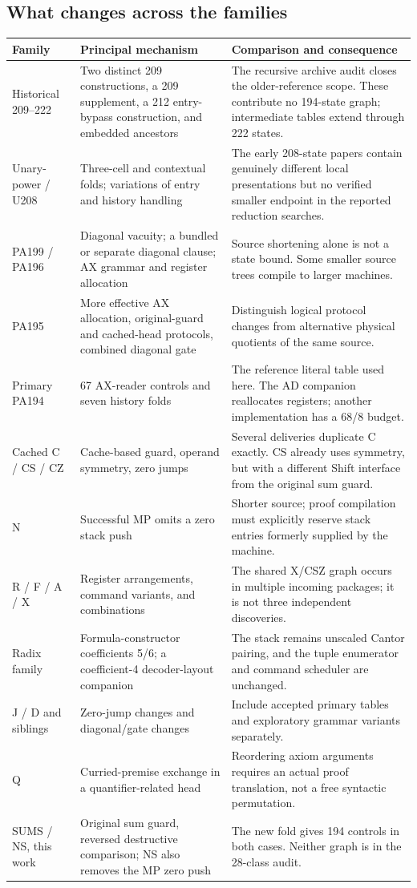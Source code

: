 \documentclass[11pt,a4paper]{article}
\begin{document}
\subsection{What changes across the families}
\begin{longtable}{p{.19\linewidth}p{.33\linewidth}p{.39\linewidth}}
\toprule
Family & Principal mechanism & Comparison and consequence\\
\midrule
Historical 209--222 & Two distinct 209 constructions, a 209 supplement,
a 212 entry-bypass construction, and embedded ancestors & The recursive
archive audit closes the older-reference scope. These contribute no
194-state graph; intermediate tables extend through 222 states.\\
Unary-power / U208 & Three-cell and contextual folds; variations of entry
and history handling & The early 208-state papers contain genuinely
different local presentations but no verified smaller endpoint in the
reported reduction searches.\\
PA199 / PA196 & Diagonal vacuity; a bundled or separate diagonal clause;
AX grammar and register allocation & Source shortening alone is not a
state bound. Some smaller source trees compile to larger machines.\\
PA195 & More effective AX allocation, original-guard and cached-head
protocols, combined diagonal gate & Distinguish logical protocol changes
from alternative physical quotients of the same source.\\
Primary PA194 & 67 AX-reader controls and seven history folds &
The reference literal table used here. The AD companion reallocates
registers; another implementation has a 68/8 budget.\\
Cached C / CS / CZ & Cache-based guard, operand symmetry, zero jumps &
Several deliveries duplicate C exactly. CS already uses symmetry, but
with a different Shift interface from the original sum guard.\\
N & Successful MP omits a zero stack push & Shorter source; proof compilation
must explicitly reserve stack entries formerly supplied by the machine.\\
R / F / A / X & Register arrangements, command variants, and combinations &
The shared X/CSZ graph occurs in multiple incoming packages; it is not
three independent discoveries.\\
Radix family & Formula-constructor coefficients 5/6; a coefficient-4
decoder-layout companion & The stack remains unscaled Cantor pairing,
and the tuple enumerator and command scheduler are unchanged.\\
J / D and siblings & Zero-jump changes and diagonal/gate changes &
Include accepted primary tables and exploratory grammar variants separately.\\
Q & Curried-premise exchange in a quantifier-related head & Reordering
axiom arguments requires an actual proof translation, not a free syntactic
permutation.\\
SUMS / NS, this work & Original sum guard, reversed destructive comparison;
NS also removes the MP zero push & The new fold gives 194 controls in
both cases. Neither graph is in the 28-class audit.\\
\bottomrule
\end{longtable}
\end{document}
